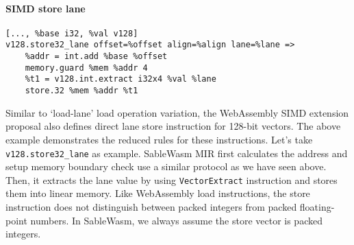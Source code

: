 \paragraph{SIMD store lane} \quad
\begin{lstlisting}[basicstyle=\linespread{1}\small, language=SableWasmMIR]
[..., %base i32, %val v128]
v128.store32_lane offset=%offset align=%align lane=%lane =>
    %addr = int.add %base %offset
    memory.guard %mem %addr 4
    %t1 = v128.int.extract i32x4 %val %lane
    store.32 %mem %addr %t1
\end{lstlisting}
Similar to `load-lane' load operation variation, the WebAssembly SIMD extension proposal also defines direct lane store instruction for 128-bit vectors. The above example demonstrates the reduced rules for these instructions. Let's take \texttt{v128.store32\_lane} as example. SableWasm MIR first calculates the address and setup memory boundary check use a similar protocol as we have seen above. Then, it extracts the lane value by using \texttt{VectorExtract} instruction and stores them into linear memory. Like WebAssembly load instructions, the store instruction does not distinguish between packed integers from packed floating-point numbers. In SableWasm, we always assume the store vector is packed integers.

